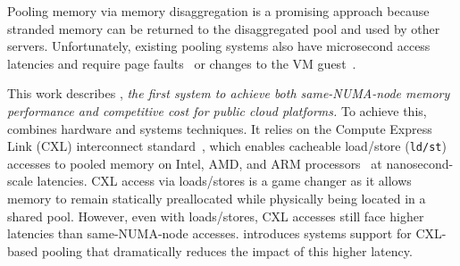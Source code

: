 Pooling memory via memory disaggregation is a promising approach
because stranded memory can be returned to the disaggregated pool and
used by other servers.  Unfortunately, existing pooling systems also
have microsecond access latencies and require page
faults~\cite{memblade.isca09, lim2011disaggregated,
  orchdisaggmem.tc20, sysdisaggmem.hpca12, nicpagefault.asplos17,
  aifm.osdi20, angel2020disaggregation} or changes to the VM
guest~\cite{aifm.osdi20, semeru.osdi20, kona.asplos21, farm.nsdi14,
  remoteregions.atc18, kvdisagg.atc20, farview.corr21,
  sysdisaggmem.hpca12, resdisagg.osdi16, infiniswap.nsdi17,
  legoos.osdi18, softfarmem.asplos19, dcm.tc19, fastswap.eurosys20,
  leap.atc20, fluidmem.icdcs20, orchdisaggmem.tc20,ememdisagg.corr20}.

 This work describes \sys, {\em the first system
  to achieve both same-NUMA-node memory performance and competitive
  cost for public cloud platforms.}  To achieve this, \sys combines
hardware and systems techniques.  It relies on the Compute Express
Link (CXL) interconnect standard~\cite{cxlsite.web20}, which enables
cacheable load/store (\texttt{ld/st}) accesses to pooled memory on
Intel, AMD, and ARM processors~\cite{intelsapphire.web21, arm2021cxl,
  amdgenoa} at nanosecond-scale latencies.  CXL access via
loads/stores is a game changer as it allows memory to remain
statically preallocated while physically being located in a shared
pool.  However, even with loads/stores, CXL accesses still face higher
latencies than same-NUMA-node accesses.  \sys introduces systems
support for CXL-based pooling that dramatically
reduces the impact of this higher latency.




\begin{comment} %
Hardware-based pooling~\cite{thymesisflow.micro20, clio.web21, zombieland.eurosys18, pberry.hotos19, dredbox.date16, memblade.isca09} can overcome this limitation, but state-of-the-art systems still have microsecond-latency~\cite{clio.web21}.
Hardware-based pooling has historically also not been available on mainstream platforms.
The Compute Express Link (CXL) interconnect standard~\cite{cxlsite.web20} overcomes both barriers and has superceded competing protocols~\cite{nextcxlgenz,sth2019cxl}.
CXL reduces latency by an order of magnitude to $\approx$100ns.
It also enables cacheable load\slash store (\texttt{ld/st}) accesses to pooled memory on Intel, AMD, and ARM processors~\cite{intelsapphire.web21, arm2021cxl, amdgenoa} and thus facilitates broad deployment with hypervisors statically pinning pool memory.
\end{comment}



